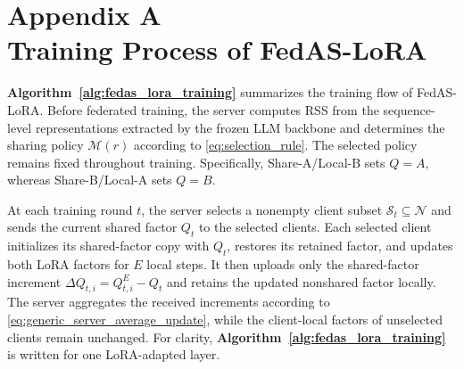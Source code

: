 \documentclass[lettersize,journal]{IEEEtran}
\begin{document}
% 






	
	\section*{Appendix A \\ Training Process of FedAS-LoRA}
	\label{app:fedas_lora_training}
	
	\textbf{Algorithm~\ref{alg:fedas_lora_training}} summarizes the training flow of FedAS-LoRA. Before federated training, the server computes RSS from the sequence-level representations extracted by the frozen LLM backbone and determines the sharing policy $\mathcal{M}(r)$ according to \eqref{eq:selection_rule}. The selected policy remains fixed throughout training. Specifically, Share-A/Local-B sets $Q=A$, whereas Share-B/Local-A sets $Q=B$.
	
	At each training round $t$, the server selects a nonempty client subset $\mathcal{S}_t\subseteq\mathcal{N}$ and sends the current shared factor $Q_t$ to the selected clients. Each selected client initializes its shared-factor copy with $Q_t$, restores its retained factor, and updates both LoRA factors for $E$ local steps. It then uploads only the shared-factor increment $\Delta Q_{t,i}=Q_{t,i}^{E}-Q_t$ and retains the updated nonshared factor locally. The server aggregates the received increments according to \eqref{eq:generic_server_average_update}, while the client-local factors of unselected clients remain unchanged.
	For clarity, \textbf{Algorithm~\ref{alg:fedas_lora_training}} is written for one LoRA-adapted layer.
	
\end{document}
